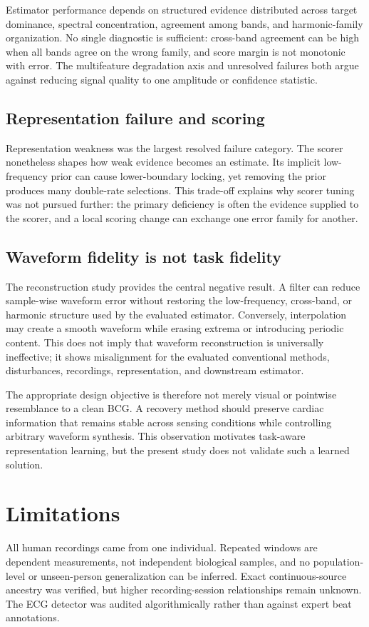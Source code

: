 \documentclass[10pt,twocolumn]{article}
\begin{document}
Estimator performance depends on structured evidence distributed across target dominance, spectral concentration, agreement among bands, and harmonic-family organization. No single diagnostic is sufficient: cross-band agreement can be high when all bands agree on the wrong family, and score margin is not monotonic with error. The multifeature degradation axis and unresolved failures both argue against reducing signal quality to one amplitude or confidence statistic.

\subsection{Representation failure and scoring}
Representation weakness was the largest resolved failure category. The scorer nonetheless shapes how weak evidence becomes an estimate. Its implicit low-frequency prior can cause lower-boundary locking, yet removing the prior produces many double-rate selections. This trade-off explains why scorer tuning was not pursued further: the primary deficiency is often the evidence supplied to the scorer, and a local scoring change can exchange one error family for another.

\subsection{Waveform fidelity is not task fidelity}
The reconstruction study provides the central negative result. A filter can reduce sample-wise waveform error without restoring the low-frequency, cross-band, or harmonic structure used by the evaluated estimator. Conversely, interpolation may create a smooth waveform while erasing extrema or introducing periodic content. This does not imply that waveform reconstruction is universally ineffective; it shows misalignment for the evaluated conventional methods, disturbances, recordings, representation, and downstream estimator.

The appropriate design objective is therefore not merely visual or pointwise resemblance to a clean BCG. A recovery method should preserve cardiac information that remains stable across sensing conditions while controlling arbitrary waveform synthesis. This observation motivates task-aware representation learning, but the present study does not validate such a learned solution.

\section{Limitations}
All human recordings came from one individual. Repeated windows are dependent measurements, not independent biological samples, and no population-level or unseen-person generalization can be inferred. Exact continuous-source ancestry was verified, but higher recording-session relationships remain unknown. The ECG detector was audited algorithmically rather than against expert beat annotations.
\end{document}

